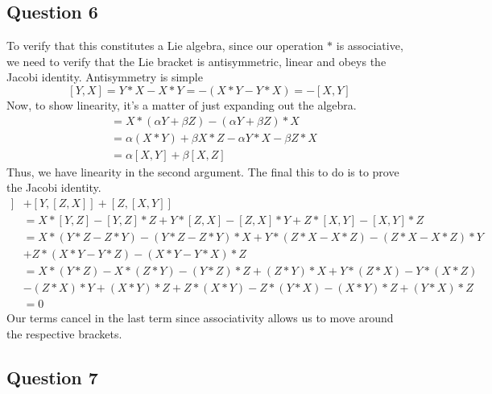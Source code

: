 \documentclass[11pt, oneside]{article}   	%
\theoremstyle{slanted}
\newcommand{\al}{ \alpha}
\newcommand{\be}{\beta}
\begin{document}
\subsection{Question 6} 
To verify that this constitutes a Lie algebra, since our operation $ * $ is associative, we need to verify that the Lie bracket is antisymmetric, linear and obeys the Jacobi identity. Antisymmetry is simple
\[ 
 	[ Y , X ] = Y * X - X * Y  =  - ( X* Y - Y *X )  = - [ X, Y ] \] Now, to show linearity, it's a matter of just expanding out the algebra. 
\begin{align*} 
	[ X, \al Y + \be Z ] & = X * ( \al Y + \be Z )  - ( \al Y + \be Z ) * X \\
				& = \alpha ( X * Y ) + \be X * Z - \al Y * X  - \be Z * X \\
				&= \al [ X, Y ] + \be [X, Z ] 
\end{align*} Thus, we have linearity in the second argument. The final this to do is to prove the Jacobi identity.
\begin{align*} 
	 [ X , [ Y , Z] ] & + [ Y , [ Z, X ]] + [ Z, [ X, Y ]] \\
	  & = X * [ Y , Z ]  - [ Y , Z ] *Z + Y * [ Z, X ] - [ Z, X] * Y + Z * [ X, Y ]  - [ X, Y ] * Z \\
	& = X * ( Y * Z - Z * Y )  - ( Y * Z - Z * Y ) * X + Y * ( Z * X - X * Z )   - ( Z  * X - X * Z ) * Y \\
	& +  Z* ( X * Y - Y * Z ) - ( X * Y - Y * X ) * Z \\
	 &  = X * ( Y * Z ) - X * ( Z * Y ) - ( Y * Z ) * Z + ( Z * Y ) * X + Y * ( Z * X ) - Y * ( X * Z ) \\
	 & - ( Z* X ) * Y + ( X* Y ) * Z + Z * ( X * Y  )  - Z * ( Y * X ) - ( X * Y ) * Z + ( Y * X ) * Z \\
	 & = 0 
\end{align*}
Our terms cancel in the last term since associativity allows us to move around the respective brackets. 

\pagebreak 
\subsection{Question 7} 
\end{document}
